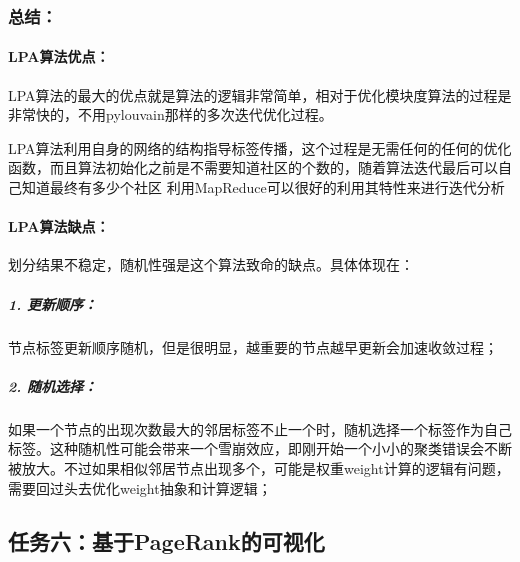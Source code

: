 \documentclass[a4paper,UTF8]{article}
\numberwithin{equation}{section}
\begin{document}
\subsubsection{总结：}
\paragraph{LPA算法优点：} 
\par LPA算法的最大的优点就是算法的逻辑非常简单，相对于优化模块度算法的过程是非常快的，不用pylouvain那样的多次迭代优化过程。
\par LPA算法利用自身的网络的结构指导标签传播，这个过程是无需任何的任何的优化函数，而且算法初始化之前是不需要知道社区的个数的，随着算法迭代最后可以自己知道最终有多少个社区
利用MapReduce可以很好的利用其特性来进行迭代分析
\paragraph{LPA算法缺点：}  
\par 划分结果不稳定，随机性强是这个算法致命的缺点。具体体现在：
\subparagraph{1. 更新顺序：}
节点标签更新顺序随机，但是很明显，越重要的节点越早更新会加速收敛过程；
\subparagraph{2. 随机选择：}
如果一个节点的出现次数最大的邻居标签不止一个时，随机选择一个标签作为自己标签。这种随机性可能会带来一个雪崩效应，即刚开始一个小小的聚类错误会不断被放大。不过如果相似邻居节点出现多个，可能是权重weight计算的逻辑有问题，需要回过头去优化weight抽象和计算逻辑；

\subsection{任务六：基于PageRank的可视化}
\end{document}
